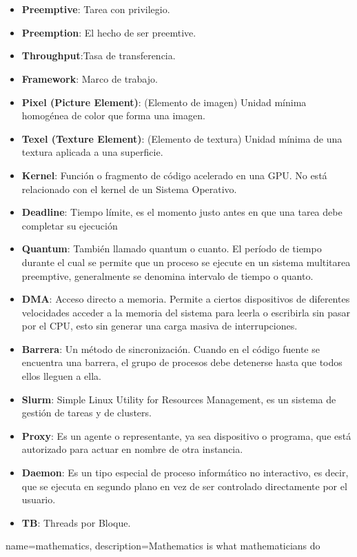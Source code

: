 \chapter{}
    \label{cha:ApendiceA}
    
\begin{itemize}
\item \textbf{Preemptive}: Tarea con privilegio.
\item \textbf{Preemption}: El hecho de ser preemtive.
\item \textbf{Throughput}:Tasa de transferencia.
\item \textbf{Framework}: Marco de trabajo.
\item \textbf{Pixel (Picture Element)}: (Elemento de imagen) Unidad mínima homogénea de color que forma una imagen.
\item \textbf{Texel (Texture Element)}: (Elemento de textura)  Unidad mínima de una textura aplicada a una superficie.
\item \textbf{Kernel}: Función o fragmento de código acelerado en una GPU. No está relacionado con el kernel de un Sistema Operativo.

\item \textbf{Deadline}: Tiempo límite, es el momento justo antes en que una tarea debe completar su ejecución

\item \textbf{Quantum}: También llamado quantum o cuanto. El período de tiempo durante el cual se permite que un proceso se ejecute en un sistema multitarea preemptive, generalmente se denomina intervalo de tiempo o quanto.


\item \textbf{DMA}: Acceso directo a memoria. Permite a ciertos dispositivos de diferentes velocidades acceder a la memoria del sistema para leerla o escribirla sin pasar por el CPU, esto sin generar una carga masiva de interrupciones.

\item \textbf{Barrera}: Un método de sincronización. Cuando en el código fuente se encuentra una barrera, el grupo de procesos debe detenerse hasta que todos ellos lleguen a ella.

\item \textbf{Slurm}: Simple Linux Utility for Resources Management, es un sistema de gestión de tareas y de clusters\cite{Slurm}.

\item \textbf{Proxy}: Es un agente o representante, ya sea dispositivo o programa, que está autorizado para actuar en nombre de otra instancia.

\item \textbf{ Daemon}: Es un tipo especial de proceso informático no interactivo, es decir, que se ejecuta en segundo plano en vez de ser controlado directamente por el usuario.

\item \textbf{TB}: Threads por Bloque.

\end{itemize}  


{
   name=mathematics,
    description={Mathematics is what mathematicians do}
}